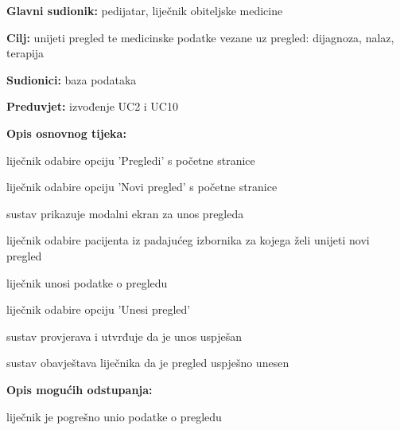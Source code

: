                     \noindent {}
					\begin{packed_item}
	
						\item \textbf{Glavni sudionik: }pedijatar, liječnik obiteljske medicine
						\item  \textbf{Cilj:} unijeti pregled te medicinske podatke vezane uz pregled: dijagnoza, nalaz, terapija
						\item  \textbf{Sudionici:} baza podataka
						\item  \textbf{Preduvjet:} izvođenje UC2 i UC10
						\item  \textbf{Opis osnovnog tijeka:}
						
						\item[] \begin{packed_enum}
							\item liječnik odabire opciju 'Pregledi' s početne stranice
							\item liječnik odabire opciju 'Novi pregled' s početne stranice
							\item sustav prikazuje modalni ekran za unos pregleda
							\item liječnik odabire pacijenta iz padajućeg izbornika za kojega želi unijeti novi pregled
							\item liječnik unosi podatke o pregledu
							\item liječnik odabire opciju 'Unesi pregled'
							\item sustav provjerava i utvrđuje da je unos uspješan
							\item sustav obavještava liječnika da je pregled uspješno unesen

						\end{packed_enum}

						\item  \textbf{Opis mogućih odstupanja:}
						
						\item[] \begin{packed_item}
	
							\item[7.a] liječnik je pogrešno unio podatke o pregledu
							\item[] \begin{packed_enum}
								

\end{packed_enum}
\end{packed_item}
\end{packed_item}
